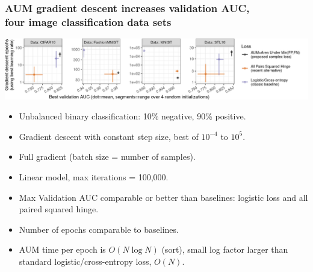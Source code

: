 \documentclass[t]{beamer}
\begin{document}
\begin{frame}
  \frametitle{AUM gradient descent increases validation AUC,\\
    four image classification data sets}
 
\includegraphics[width=\textwidth]{data_Classif_batchtools_best_valid_scatter}

\begin{itemize}
\item Unbalanced binary classification: 10\% negative, 90\% positive.
\item Gradient descent with constant step size, best of $10^{-4}$ to $10^5$.
\item Full gradient (batch size = number of samples).
\item Linear model, max iterations = 100,000.
\item Max Validation AUC comparable or better than baselines: logistic loss and all paired squared hinge.
\item Number of epochs comparable to baselines.
\item AUM time per epoch is $O(N \log N)$ (sort), small log factor larger than standard logistic/cross-entropy loss, $O(N)$.
\end{itemize}

\end{frame}
\end{document}
